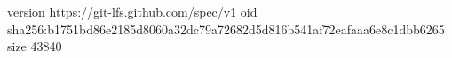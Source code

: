 version https://git-lfs.github.com/spec/v1
oid sha256:b1751bd86e2185d8060a32dc79a72682d5d816b541af72eafaaa6e8c1dbb6265
size 43840
